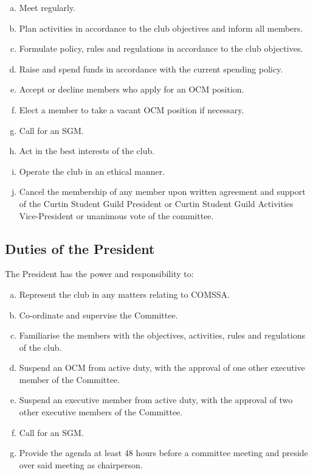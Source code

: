 \documentclass[a4paper,12pt]{article}
\begin{document}
\begin{enumerate}[a)]
	\item Meet regularly.
	\item Plan activities in accordance to the club objectives and inform all members.
	\item Formulate policy, rules and regulations in accordance to the club objectives.
	\item Raise and spend funds in accordance with the current spending policy.
	\item Accept or decline members who apply for an OCM position.
	\item Elect a member to take a vacant OCM position if necessary.
	\item Call for an SGM.
	\item Act in the best interests of the club.
	\item Operate the club in an ethical manner.
	\item Cancel the membership of any member upon written agreement and support of the Curtin Student Guild President or Curtin Student Guild Activities Vice-President or unanimous vote of the committee.
\end{enumerate}

\subsection{Duties of the President}

The President has the power and responsibility to:

\begin{enumerate}[a)]
	\item Represent the club in any matters relating to COMSSA.
	\item Co-ordinate and supervise the Committee.
	\item Familiarise the members with the objectives, activities, rules and regulations of the club.
	\item Suspend an OCM from active duty, with the approval of one other executive member of the Committee.
	\item Suspend an executive member from active duty, with the approval of two other executive members of the Committee.
	\item Call for an SGM.
	\item Provide the agenda at least 48 hours before a committee meeting and preside over said meeting as chairperson.
\end{enumerate}
\end{document}
